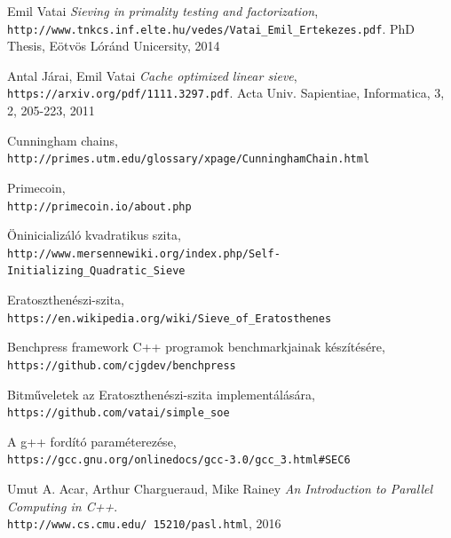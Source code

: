 \documentclass[twoside, a4paper, 12pt]{article}
\begin{document}
\begin{thebibliography}{9}
Emil Vatai
\textit{Sieving in primality testing and factorization},
\\\texttt{http://www.tnkcs.inf.elte.hu/vedes/Vatai\_Emil\_Ertekezes.pdf}.
PhD Thesis, Eötvös Lóránd Unicersity, 2014

Antal Járai, Emil Vatai
\textit{Cache optimized linear sieve},
\\\texttt{https://arxiv.org/pdf/1111.3297.pdf}.
Acta Univ. Sapientiae, Informatica, 3, 2, 205-223, 2011

Cunningham chains,
\\\texttt{http://primes.utm.edu/glossary/xpage/CunninghamChain.html}

Primecoin, 
\\\texttt{http://primecoin.io/about.php}

Öninicializáló kvadratikus szita,
\\\texttt{http://www.mersennewiki.org/index.php/Self-Initializing\_Quadratic\_Sieve}

Eratoszthenészi-szita,
\\\texttt{https://en.wikipedia.org/wiki/Sieve\_of\_Eratosthenes}

Benchpress framework C++ programok benchmarkjainak készítésére,
\\\texttt{https://github.com/cjgdev/benchpress}

Bitműveletek az Eratoszthenészi-szita implementálására,
\\\texttt{https://github.com/vatai/simple\_soe}

A g++ fordító paraméterezése,
\\\texttt{https://gcc.gnu.org/onlinedocs/gcc-3.0/gcc\_3.html\#SEC6}

Umut A. Acar, Arthur Chargueraud, Mike Rainey
\textit{An Introduction to Parallel Computing in C++}.
\\\texttt{http://www.cs.cmu.edu/~15210/pasl.html}, 2016
\end{thebibliography}
\end{document}
